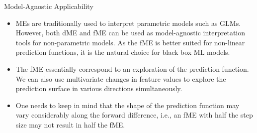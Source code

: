 \documentclass[11pt,compress,t,notes=noshow, xcolor=table]{beamer}
\begin{document}
\begin{vbframe}{Model-Agnostic Applicability}

\begin{itemize}
\setlength\itemsep{2em}
\item MEs are traditionally used to interpret parametric models such as GLMs. However, both dME and fME can be used as model-agnostic interpretation tools for non-parametric models. As the fME is better suited for non-linear prediction functions, it is the natural choice for black box ML models.
\item The fME essentially correspond to an exploration of the prediction function. We can also use multivariate changes in feature values to explore the prediction surface in various directions simultaneously.
\item One needs to keep in mind that the shape of the prediction function may vary considerably along the forward difference, i.e., an fME with half the step size may not result in half the fME. 
\end{itemize}

\end{vbframe}








\endlecture
\end{document}
